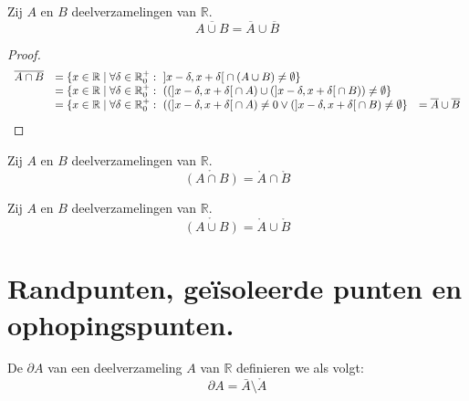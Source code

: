 \documentclass[main.tex]{subfiles}
\begin{document}
\begin{st}
  Zij $A$ en $B$ deelverzamelingen van $\mathbb{R}$.
  \[ \overline{A \cup B} = \overline{A} \cup \overline{B} \]

  \begin{proof}
    \[
    \begin{array}{rll}
      \overline{A \cap B} 
      &= \{ x\in \mathbb{R} \mid \forall \delta \in \mathbb{R}_{0}^{+}:\ \interval[open]{x-\delta}{ x+\delta} \cap (A \cup B) \neq \emptyset \}\\
      &= \{ x\in \mathbb{R} \mid \forall \delta \in \mathbb{R}_{0}^{+}:\ ((\interval[open]{x-\delta}{ x+\delta} \cap A) \cup (\interval[open]{x-\delta}{ x+\delta} \cap B)) \neq \emptyset \}\\
      &= \{ x\in \mathbb{R} \mid \forall \delta \in \mathbb{R}_{0}^{+}:\ ((\interval[open]{x-\delta}{ x+\delta} \cap A) \neq 0 \vee (\interval[open]{x-\delta}{ x+\delta} \cap B) \neq \emptyset \}
      &= \overline{A} \cup \overline{B} \\
    \end{array}
    \]
  \end{proof}
\feed
{}
\end{st}


\begin{st}
  Zij $A$ en $B$ deelverzamelingen van $\mathbb{R}$.
  \[ \mathring{\left(A \cap B\right)} = \mathring{A} \cap \mathring{B} \]

\end{st}

\begin{st}
  Zij $A$ en $B$ deelverzamelingen van $\mathbb{R}$.
  \[ \mathring{\left(A \cup B\right)} = \mathring{A} \cup \mathring{B} \]

\end{st}


\section{Randpunten, ge\"isoleerde punten en ophopingspunten.}
\label{sec:randp-geis-punt}

\begin{de}
  De  $\partial A$ van een deelverzameling $A$ van $\mathbb{R}$ definieren we als volgt:
  \[ \partial A = \bar{A} \setminus \mathring{A} \]
\end{de}
\end{document}
